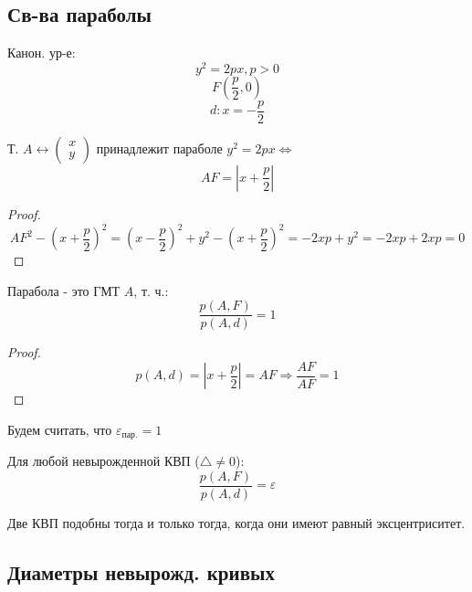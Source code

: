 \subsection{Св-ва параболы}
Канон. ур-е: \[
  y^{2} = 2px, p > 0
\]
\[
F\left(\frac{p}{2}, 0\right)
\]
\[
d \colon x = -\frac{p}{2}
\]
\begin{statement}
Т. $A \underset{}{\longleftrightarrow} \begin{pmatrix}x \\ y \end{pmatrix}$ принадлежит параболе $y^{2} = 2px \iff$
\[
AF = \left|x + \frac{p}{2}\right|
\]
\end{statement}
\begin{proof}
\[
AF^{2} - \left(x + \frac{p}{2}\right)^{2} = \left(x - \frac{p}{2}\right)^{2} + y^{2} - \left(x + \frac{p}{2}\right)^{2} = -2xp + y^{2} = -2xp + 2xp = 0
\]
\end{proof}
\begin{consequence}
Парабола - это ГМТ $A$, т. ч.:
\[
  \frac{p(A, F)}{p(A, d)} = 1
\]
\end{consequence}
\begin{proof}
\[
p(A, d) = \left|x + \frac{p}{2}\right| = AF \Rightarrow \frac{AF}{AF} = 1
\]
\end{proof}
\begin{definition}
Будем считать, что $\varepsilon_{\text{пар.}} = 1$
\end{definition}

\begin{theorem}[Об эксцентриситете]
Для любой невырожденной КВП ($\triangle \neq 0$):
\[
  \frac{p(A, F)}{p(A, d)} = \varepsilon
\]
\end{theorem}
\begin{statement}
Две КВП подобны тогда и только тогда, когда они имеют равный эксцентриситет.
\end{statement}

\subsection{Диаметры невырожд. кривых}
